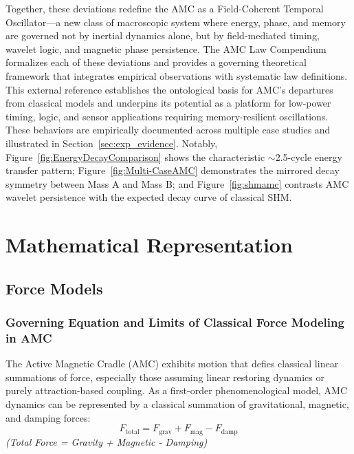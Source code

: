 \documentclass[10pt,aps,pre,onecolumn,superscriptaddress,notitlepage]{revtex4-2}
\begin{document}
Together, these deviations redefine the AMC as a Field-Coherent Temporal Oscillator—a new class of macroscopic system where energy, phase, and memory are governed not by inertial dynamics alone, but by field-mediated timing, wavelet logic, and magnetic phase persistence.
The AMC Law Compendium formalizes each of these deviations and provides a governing theoretical framework that integrates empirical observations with systematic law definitions. This external reference establishes the ontological basis for AMC’s departures from classical models and underpins its potential as a platform for low-power timing, logic, and sensor applications requiring memory-resilient oscillations. These behaviors are empirically documented across multiple case studies and illustrated in  Section~\ref{sec:exp_evidence}. Notably, Figure~\ref{fig:EnergyDecayComparison} shows the characteristic $\sim$2.5-cycle energy transfer pattern; Figure~\ref{fig:Multi-CaseAMC} demonstrates the mirrored decay symmetry between Mass A and Mass B; and Figure~\ref{fig:shmamc} contrasts AMC wavelet persistence with the expected decay curve of classical SHM.

\section{Mathematical Representation}
\label{sec:math_rep}
\subsection{Force Models}
\subsubsection{Governing Equation and Limits of Classical Force Modeling in AMC}
The Active Magnetic Cradle (AMC) exhibits motion that defies classical linear summations of force, especially those assuming linear restoring dynamics or purely attraction-based coupling. As a first-order phenomenological model, AMC dynamics can be represented by a classical summation of gravitational, magnetic, and damping forces: 
\begin{equation}
F_{\text{total}} = F_{\text{grav}} + F_{\text{mag}} - F_{\text{damp}}
\label{eq:total_force}
\end{equation}
\noindent\textit{(Total Force = Gravity + Magnetic - Damping)}
\end{document}
